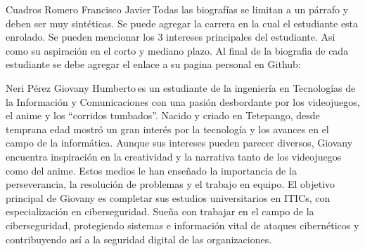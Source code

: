 \documentclass{IEEEcsmag}
\begin{document}
\begin{IEEEbiography}{Cuadros Romero Francisco Javier}{\,}Todas las biografías se limitan a un párrafo y deben ser muy sintéticas. Se puede agregar la carrera en la cual el estudiante esta enrolado. Se pueden mencionar los 3 intereses principales del estudiante. Asi como su aspiración en el corto y mediano plazo. Al final de la biografia de cada estudiante se debe agregar el enlace a su pagina personal en Github: 
\end{IEEEbiography}

\begin{IEEEbiography}{Neri Pérez Giovany Humberto}{\,}es un estudiante de la ingeniería en Tecnologías de la Información y Comunicaciones con una pasión desbordante por los videojuegos, el anime y los ``corridos tumbados''. Nacido y criado en  Tetepango, desde temprana edad mostró un gran interés por la tecnología y los avances en el campo de la informática. Aunque sus intereses pueden parecer diversos, Giovany encuentra inspiración en la creatividad y la narrativa tanto de los videojuegos como del anime. Estos medios le han enseñado la importancia de la perseverancia, la resolución de problemas y el trabajo en equipo. El objetivo principal de Giovany es completar sus estudios universitarios en ITICs, con especialización en ciberseguridad. Sueña con trabajar en el campo de la ciberseguridad, protegiendo sistemas e información vital de ataques cibernéticos y contribuyendo así a la seguridad digital de las organizaciones.
\end{IEEEbiography}
\end{document}
